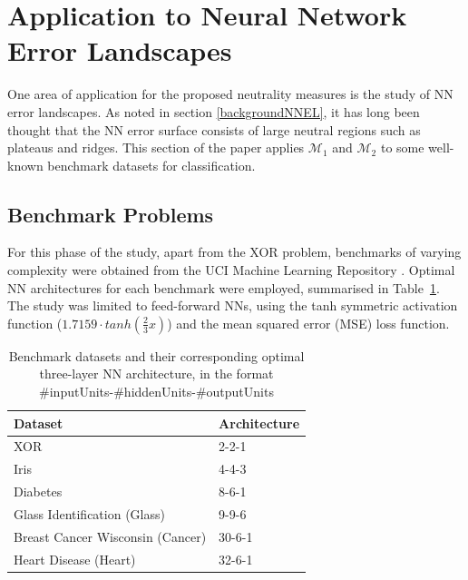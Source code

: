 \documentclass[conference]{IEEEtran}
\begin{document}
%		

\section{Application to Neural Network Error Landscapes}
\label{nnELApplication}
One area of application for the proposed neutrality measures is the study of NN error landscapes. As noted in section \ref{backgroundNNEL}, it has long been thought that the NN error surface consists of large neutral regions such as plateaus and ridges. This section of the paper applies ${\mathcal{M}_1}$ and ${\mathcal{M}_2}$ to some well-known benchmark datasets for classification.

\subsection{Benchmark Problems}
\label{nnBenchmarks}
For this phase of the study, apart from the XOR problem, benchmarks of varying complexity were obtained from the UCI Machine Learning Repository \cite{Lichman2013}. Optimal NN architectures for each benchmark were employed, summarised in Table~\ref{tblNNBenchmarks}. The study was limited to feed-forward NNs, using the tanh \cite{lecun1989generalization} symmetric activation function ($1.7159\cdot tanh(\frac{2}{3}x)$) and the mean squared error (MSE) loss function.

\begin{table}[!t] 
	\renewcommand{\arraystretch}{1.3}
	\caption{Benchmark datasets and their corresponding optimal three-layer NN architecture, in the format \#inputUnits-\#hiddenUnits-\#outputUnits}
	\label{tblNNBenchmarks}
	\centering
	\begin{tabular}{|l|l|}
		\hline
		\textbf{Dataset}		& \textbf{Architecture} \\ \hline				
		XOR									&  2-2-1		\\
		Iris								&  4-4-3 \cite{gupta1998weight}		\\
		Diabetes							&  8-6-1 \cite{carvalho2006particle}			\\
		Glass Identification (Glass)		&  9-9-6 \cite{gupta1998weight}			\\
		Breast Cancer Wisconsin (Cancer)	&  30-6-1 \cite{carvalho2006particle}		\\
		Heart Disease (Heart)				&  32-6-1 \cite{carvalho2006particle}	\\ \hline		
	\end{tabular}
\end{table}
\end{document}

